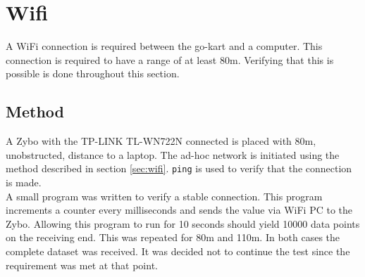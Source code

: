 \section{Wifi}
A WiFi connection is required between the go-kart and a computer.
This connection is required to have a range of at least 80\si{\metre}.
Verifying that this is possible is done throughout this section.

\subsection{Method}
A Zybo with the TP-LINK TL-WN722N connected is placed with 80\si{\metre}, unobstructed, distance to a laptop.
The ad-hoc network is initiated using the method described in section \ref{sec:wifi}.
\texttt{ping} is used to verify that the connection is made.\\
A small program was written to verify a stable connection.
This program increments a counter every milliseconds and sends the value via WiFi PC to the Zybo.
Allowing this program to run for 10 seconds should yield 10000 data points on the receiving end.
This was repeated for 80\si{\metre} and 110\si{\metre}.
In both cases the complete dataset was received.
It was decided not to continue the test since the requirement was met at that point.
